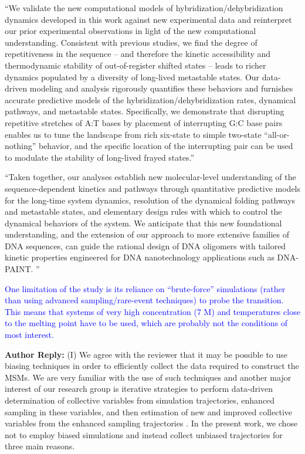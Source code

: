 \documentclass[11pt,a4paper]{letter} %
\begin{document}
``We validate the new computational models of hybridization/dehybridization dynamics developed in this work against new experimental data and reinterpret our prior experimental observations in light of the new computational understanding. Consistent with previous studies, \citep{Hinckley2014Coarse-grainedEffects,Romano2013DNADependence,Araque2016LatticeCooperativity} we find the degree of repetitiveness in the sequence -- and therefore the kinetic accessibility and thermodynamic stability of out-of-register shifted states -- leads to richer dynamics populated by a diversity of long-lived metastable states. Our data-driven modeling and analysis rigorously quantifies these behaviors and furnishes accurate predictive models of the hybridization/dehybridization rates, dynamical pathways, and metastable states. Specifically, we demonstrate that disrupting repetitive stretches of A:T bases by placement of interrupting G:C base pairs enables us to tune the landscape from rich six-state to simple two-state ``all-or-nothing'' behavior, and the specific location of the interrupting pair can be used to modulate the stability of long-lived frayed states.''

``Taken together, our analyses establish new molecular-level understanding of the sequence-dependent kinetics and pathways through quantitative predictive models for the long-time system dynamics, resolution of the dynamical folding pathways and metastable states, and elementary design rules with which to control the dynamical behaviors of the system. We anticipate that this new foundational understanding, and the extension of our approach to more extensive families of DNA sequences, can guide the rational design of DNA oligomers with tailored kinetic properties engineered for DNA nanotechnology applications such as DNA-PAINT. \citep{Shah2019, Strauss2020UpDNA-PAINT}'' 




\textcolor{blue}{One limitation of the study is its reliance on ``brute-force'' simulations (rather than using advanced sampling/rare-event techniques) to probe the transition. This means that systems of very high concentration (7 M) and temperatures close to the melting point have to be used, which are probably not the conditions of most interest.}

\textbf{Author Reply:}    (I) We agree with the reviewer that it may be possible to use biasing techniques in order to efficiently collect the data required to construct the MSMs. We are very familiar with the use of such techniques and another major interest of our research group is iterative strategies to perform data-driven determination of collective variables from simulation trajectories, enhanced sampling in these variables, and then estimation of new and improved collective variables from the enhanced sampling trajectories \citep{Sidky2020MolecularSimulators, Sidky2020MachineSimulation, Chen2019CapabilitiesSystems, Chen2019NonlinearVAMPnets, Phys2018CollectiveDesign, Chen2018MolecularExploration}. In the present work, we chose not to employ biased simulations and instead collect unbiased trajectories for three main reasons. 
\end{document}
